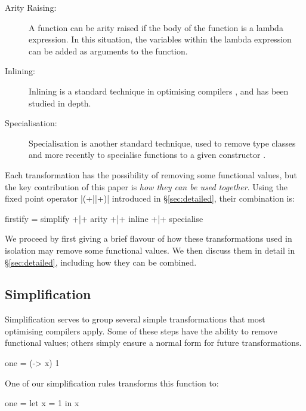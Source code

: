 \documentclass[preprint]{sigplanconf}
\begin{document}
\begin{description}
\item[Arity Raising:] A function can be arity raised if the body of the function is a lambda expression. In this situation, the variables within the lambda expression can be added as arguments to the function.
\item[Inlining:] Inlining is a standard technique in optimising compilers \cite{spj:inlining}, and has been studied in depth.
\item[Specialisation:] Specialisation is another standard technique, used to remove type classes \cite{jones:dictionary_free} and more recently to specialise functions to a given constructor \cite{spj:specconstr}.
\end{description}

Each transformation has the possibility of removing some functional values, but the key contribution of this paper is \textit{how they can be used together}. Using the fixed point operator |(+||+)| introduced in \S\ref{sec:detailed}, their combination is:

\begin{code}
firstify = simplify +|+ arity +|+ inline +|+ specialise
\end{code}

We proceed by first giving a brief flavour of how these transformations used in isolation may remove some functional values. We then discuss them in detail in \S\ref{sec:detailed}, including how they can be combined.


\subsection{Simplification}

Simplification serves to group several simple transformations that most optimising compilers apply. Some of these steps have the ability to remove functional values; others simply ensure a normal form for future transformations.

\begin{example}
\begin{code}
one = (\x -> x) 1
\end{code}

One of our simplification rules transforms this function to:

\begin{code}
one = let x = 1 in x
\end{code}
\end{example}
\end{document}
